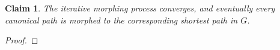 \documentclass[11pt]{article}
\newtheorem{claim}[theorem]{Claim}
\begin{document}
\begin{claim}
    The iterative morphing process converges, and eventually every canonical path is morphed to the corresponding shortest path in $G$.
\end{claim}
\begin{proof}

\end{proof}
\end{document}
